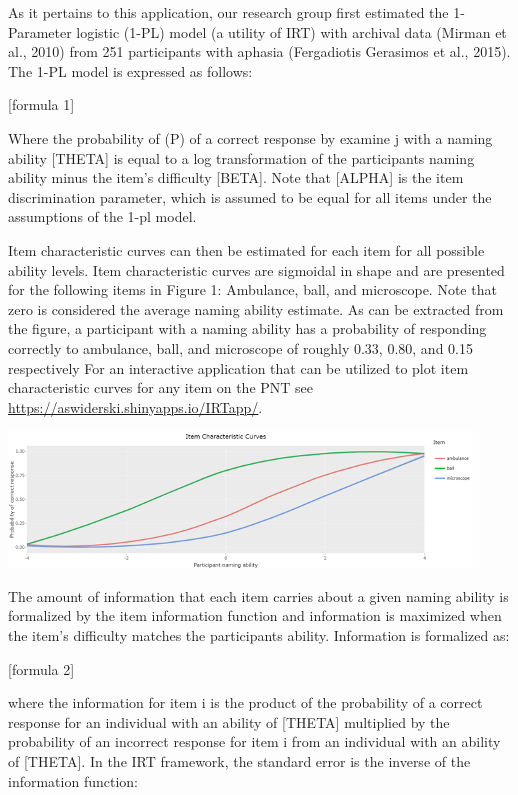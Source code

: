 \documentclass[
  english,
  jou]{apa6}
\begin{document}
As it pertains to this application, our research group first estimated the 1-Parameter logistic (1-PL) model (a utility of IRT) with archival data (Mirman et al., 2010) from 251 participants with aphasia (Fergadiotis Gerasimos et al., 2015). The 1-PL model is expressed as follows:

{[}formula 1{]}

Where the probability of (P) of a correct response by examine j with a naming ability {[}THETA{]} is equal to a log transformation of the participants naming ability minus the item's difficulty {[}BETA{]}. Note that {[}ALPHA{]} is the item discrimination parameter, which is assumed to be equal for all items under the assumptions of the 1-pl model.

Item characteristic curves can then be estimated for each item for all possible ability levels. Item characteristic curves are sigmoidal in shape and are presented for the following items in Figure 1: Ambulance, ball, and microscope. Note that zero is considered the average naming ability estimate. As can be extracted from the figure, a participant with a naming ability has a probability of responding correctly to ambulance, ball, and microscope of roughly 0.33, 0.80, and 0.15 respectively For an interactive application that can be utilized to plot item characteristic curves for any item on the PNT see \url{https://aswiderski.shinyapps.io/IRTapp/}.

\includegraphics{fig1.png}

The amount of information that each item carries about a given naming ability is formalized by the item information function and information is maximized when the item's difficulty matches the participants ability. Information is formalized as:

{[}formula 2{]}

where the information for item i is the product of the probability of a correct response for an individual with an ability of {[}THETA{]} multiplied by the probability of an incorrect response for item i from an individual with an ability of {[}THETA{]}. In the IRT framework, the standard error is the inverse of the information function:
\end{document}
